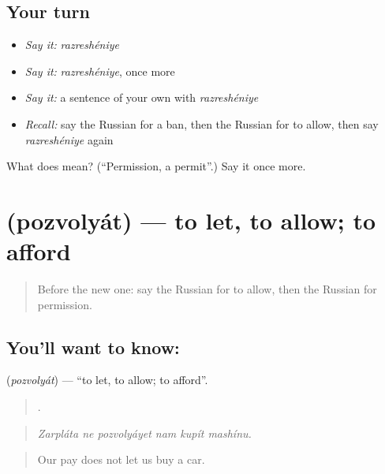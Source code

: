 \subsection*{Your turn}
\begin{itemize}
\raggedright
  \item \emph{Say it:} \emph{razreshéniye}
  \item \emph{Say it:} \emph{razreshéniye}, once more
  \item \emph{Say it:} a sentence of your own with \emph{razreshéniye}
  \item \emph{Recall:} say the Russian for a ban, then the Russian for to allow, then say \emph{razreshéniye} again
\end{itemize}

\begin{tcolorbox}[breakable,colback=teal!4,colframe=teal!35!black,title={Before you move on}]
What does  mean? (\textquotedblleft{}Permission, a permit\textquotedblright{}.) Say it once more.
\end{tcolorbox}
\section[\texorpdfstring{\ru{позволять} (pozvolyát)}{позволять (pozvolyát)}]{ (pozvolyát) — to let, to allow; to afford}

\label{lesson:RU-C389-pozvolyat}



\begin{quote}
Before the new one: say the Russian for to allow, then the Russian for permission.
\end{quote}

\subsection*{You'll want to know: }
\textbf{} (\emph{pozvolyát}) — \textquotedblleft{}to let, to allow; to afford\textquotedblright{}.

\begin{quote}
     .
\end{quote}

\begin{quote}
\emph{Zarpláta ne pozvolyáyet nam kupít mashínu.}
\end{quote}

\begin{quote}
Our pay does not let us buy a car.
\end{quote}

